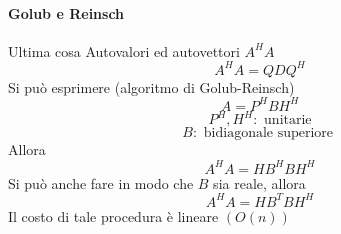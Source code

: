 \paragraph{Golub e Reinsch}
Ultima cosa
Autovalori ed autovettori $A^{H}A$
$$A^{H}A = QDQ^{H} $$
Si può esprimere (algoritmo di Golub-Reinsch)
$$ A = P^{H}BH^{H} $$
$$P^{H}, H^{H}: \text{ unitarie} $$
$$ B: \text{ bidiagonale superiore } $$
Allora
$$A^{H}A = HB^{H}BH^{H}$$
Si può anche fare in modo che $B$ sia reale,
allora
$$ A^{H}A = HB^{T}BH^{H} $$
Il costo di tale procedura \`e lineare $(O(n))$

\outbpdocument
